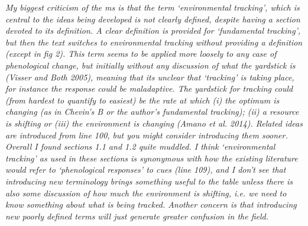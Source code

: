 \documentclass[11pt]{article}
\begin{document}
\emph{My biggest criticism of the ms is that the term `environmental tracking', which is central to
the ideas being developed is not clearly defined, despite having a section devoted to its
definition. A clear definition is provided for `fundamental tracking', but then the text
switches to environmental tracking without providing a definition (except in fig 2). This
term seems to be applied more loosely to any case of phenological change, but initially
without any discussion of what the yardstick is (Visser and Both 2005), meaning that its
unclear that `tracking' is taking place, for instance the response could be maladaptive. The
yardstick for tracking could (from hardest to quantify to easiest) be the rate at which (i)
the optimum is changing (as in Chevin's B or the author's fundamental tracking); (ii) a
resource is shifting or (iii) the environment is changing (Amano et al. 2014). Related ideas
are introduced from line 100, but you might consider introducing them sooner. Overall I found
sections 1.1 and 1.2 quite muddled. I think `environmental tracking' as used in these
sections is synonymous with how the existing literature would refer to `phenological
responses' to cues (line 109), and I don't see that introducing new terminology brings
something useful to the table unless there is also some discussion of how much the
environment is shifting, i.e. we need to know something about what is being tracked.  Another
concern is that introducing new poorly defined terms will just generate greater confusion in
the field.}\\
\end{document}
